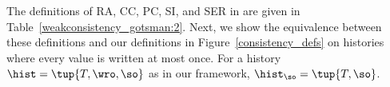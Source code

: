\begin{table}
 \centering
 \caption{Consistency model definitions in \citet{DBLP:conf/concur/Cerone0G15}.}
 \label{weakconsistency_gotsman:2}
\end{table}



The definitions of RA, CC, PC, SI, and SER in \citet{DBLP:conf/concur/Cerone0G15} are given in Table~\ref{weakconsistency_gotsman:2}. Next, we show the equivalence between these definitions and our definitions in Figure~\ref{consistency_defs} on histories where every value is written at most once. For a history $\hist = \tup{T, \wro, \so}$ as in our framework, $\hist_{\so} = \tup{T, \so}$.

